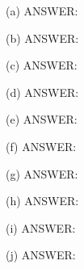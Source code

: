 
\SOLUTION

(a)
ANSWER: 

(b)
ANSWER: 

(c)
ANSWER: 

(d)
ANSWER: 

(e)
ANSWER: 

(f)
ANSWER: 

(g)
ANSWER: 

(h)
ANSWER: 

(i)
ANSWER: 

(j)
ANSWER: 

